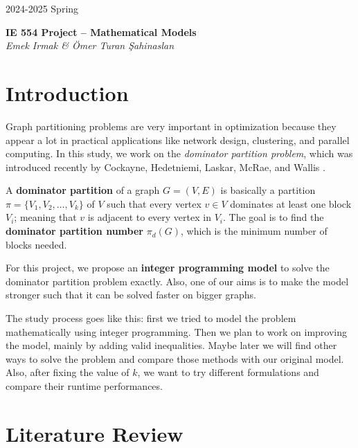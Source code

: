 \documentclass[12pt]{article}
\begin{document}
\begin{tcolorbox}[colback=white, bottomrule=1mm, sharp corners]
    2024-2025 Spring
    \begin{center}
        \Large
        \textbf{IE 554 Project -- Mathematical Models}
        \\[4mm]
        \normalsize
        \hfill \textsl{Emek Irmak \& Ömer Turan Şahinaslan}
    \end{center}
\end{tcolorbox}

\tableofcontents
\clearpage
{}

\section{Introduction}

Graph partitioning problems are very important in optimization because they appear a lot in practical applications like network design, clustering, and parallel computing. In this study, we work on the \emph{dominator partition problem}, which was introduced recently by Cockayne, Hedetniemi, Laskar, McRae, and Wallis \cite{dominator_partitions}.

A \textbf{dominator partition} of a graph $G = (V,E)$ is basically a partition $\pi = \{V_1, V_2, \dots, V_k\}$ of $V$ such that every vertex $v \in V$ dominates at least one block $V_i$; meaning that $v$ is adjacent to every vertex in $V_i$. The goal is to find the \textbf{dominator partition number} $\pi_d(G)$, which is the minimum number of blocks needed.

For this project, we propose an \textbf{integer programming model} to solve the dominator partition problem exactly. Also, one of our aims is to make the model stronger such that it can be solved faster on bigger graphs.

The study process goes like this: first we tried to model the problem mathematically using integer programming. Then we plan to work on improving the model, mainly by adding valid inequalities. Maybe later we will find other ways to solve the problem and compare those methods with our original model. Also, after fixing the value of $k$, we want to try different formulations and compare their runtime performances.

\section{Literature Review}
\end{document}

